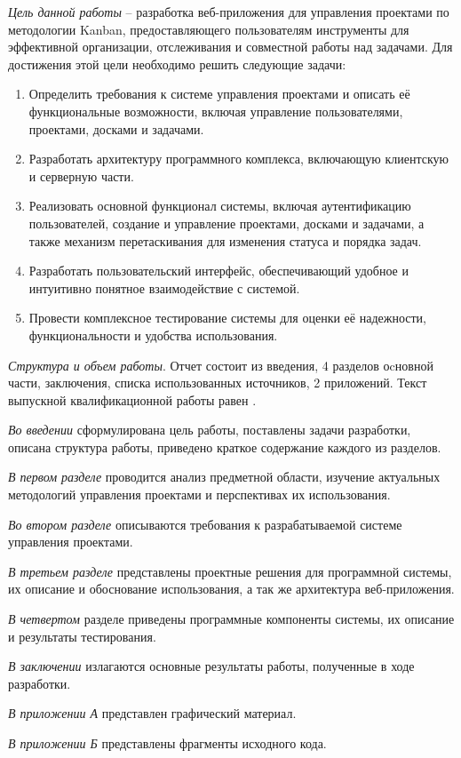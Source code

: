 \textit{Цель данной работы} -- разработка веб-приложения для управления проектами по методологии Kanban, предоставляющего пользователям инструменты для эффективной организации, отслеживания и совместной работы над задачами. Для достижения этой цели необходимо решить следующие задачи:
\begin{enumerate}
	\item Определить требования к системе управления проектами и описать её функциональные возможности, включая управление пользователями, проектами, досками и задачами.
	\item Разработать архитектуру программного комплекса, включающую клиентскую и серверную части.
	\item Реализовать основной функционал системы, включая аутентификацию пользователей, создание и управление проектами, досками и задачами, а также механизм перетаскивания для изменения статуса и порядка задач.
	\item Разработать пользовательский интерфейс, обеспечивающий удобное и интуитивно понятное взаимодействие с системой.
	\item Провести комплексное тестирование системы для оценки её надежности, функциональности и удобства использования.
\end{enumerate}

\textit{Структура и объем работы}. Отчет состоит из введения, 4 разделов оcновной части, заключения, списка использованных источников, 2 приложений. Текст выпускной квалификационной работы равен .

\textit{Во введении} сформулирована цель работы, поставлены задачи разработки, описана структура работы, приведено краткое содержание каждого из
разделов.

\textit{В первом разделе} проводится анализ предметной области, изучение актуальных методологий управления проектами и перспективах их использования.

\textit{Во втором разделе} описываются требования к разрабатываемой системе управления проектами.

\textit{В третьем разделе} представлены проектные решения для программной системы, их описание и обоснование использования, а так же архитектура веб-приложения.

\textit{В четвертом} разделе приведены программные компоненты системы,
их описание и результаты тестирования.

\textit{В заключении} излагаются основные результаты работы, полученные в
ходе разработки.

\textit{В приложении А} представлен графический материал.

\textit{В приложении Б} представлены фрагменты исходного кода.